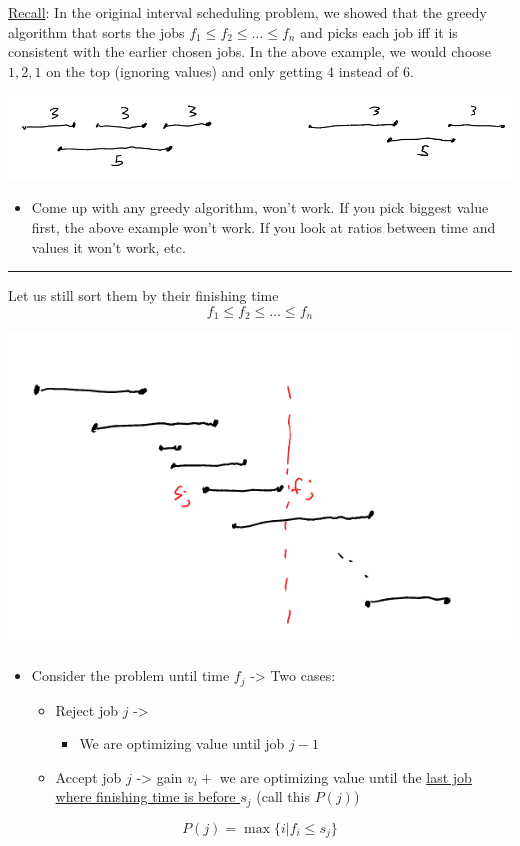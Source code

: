\documentclass[11pt]{article}
\begin{document}
\uline{Recall}: In the original interval scheduling problem, we showed that the greedy algorithm that sorts the jobs \(f_1 \leq f_2 \leq \ldots \leq f_n\) and picks each job iff it is consistent with the earlier chosen jobs. In the above example, we would choose \(1,2,1\) on the top (ignoring values) and only getting \(4\) instead of \(6\).
\begin{center}
\includegraphics[width=.9\linewidth]{./Images/i82.png}
\end{center}
\begin{itemize}
\item Come up with any greedy algorithm, won't work. If you pick biggest value first, the above example won't work. If you look at ratios between time and values it won't work, etc.
\end{itemize}

\noindent\rule{\textwidth}{0.5pt}
Let us still sort them by their finishing time
$$ f_1 \leq f_2 \leq \ldots \leq f_n$$
\begin{center}
\includegraphics[width=.9\linewidth]{./Images/i83.png}
\end{center}
\begin{itemize}
\item Consider the problem until time \(f_j\) -> Two cases:
\begin{itemize}
\item Reject job \(j\) ->
\begin{itemize}
\item We are optimizing value until job \(j-1\)
\end{itemize}
\item Accept job \(j\) -> gain \(v_i +\) we are optimizing value until the \uline{last job where finishing time is before \(s_j\)} (call this \(P(j)\))
\end{itemize}
\end{itemize}
$$ P(j) = \max \{i | f_i \leq s_j\}$$
\end{document}
